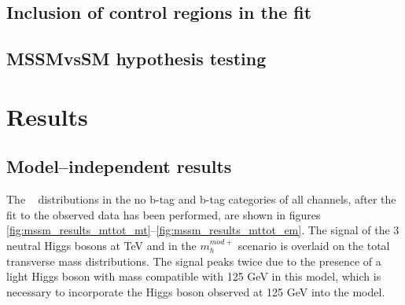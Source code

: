 \subsection{Inclusion of control regions in the fit}
\label{sec:mssm_sigext_ctrl}

\subsection{MSSMvsSM hypothesis testing}
\label{sec:mssm_sigext_mssmvssm}

\section{Results}
\label{sec:mssm_results}

\subsection{Model--independent results}
\label{sec:mssm_results_modelindep}
The \mTtot~ distributions in the no b-tag and b-tag
categories of all channels, after the fit to the observed
data has been performed, are shown in figures \ref{fig:mssm_results_mttot_mt}--\ref{fig:mssm_results_mttot_em}.
The signal of the 3 neutral Higgs bosons at  TeV and  in the $m_{h}^{mod+}$ scenario is overlaid 
on the total transverse mass distributions. The signal peaks twice due to the presence of a light Higgs boson
with mass compatible with 125 GeV in this model, which is necessary to incorporate the Higgs boson
observed at 125 GeV into the model.

